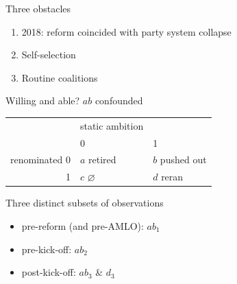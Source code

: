\documentclass[bigger]{beamer}
\begin{document}
\begin{frame}[label={sec:org280277d}]{Three obstacles}
\begin{enumerate}
\item 2018: reform coincided with party system collapse
\item Self-selection
\item Routine coalitions \pause
\end{enumerate}
\begin{block}{Willing and able? \(ab\) confounded}
\begin{center}
\begin{tabular}{rll}
 & static ambition & \\
 & 0 & 1\\
\hline
renominated 0 & \(a\) retired & \(b\) pushed out\\
1 & \(c\) \(\varnothing\) & \(d\) reran\\
\end{tabular}
\end{center}
\pause
\end{block}
\begin{block}{Three distinct subsets of observations}
\begin{itemize}
\item pre-reform (and pre-AMLO): \(ab_1\)
\item pre-kick-off: \(ab_2\)
\item post-kick-off: \(ab_3\) \& \(d_3\)
\end{itemize}
\end{block}
\end{frame}
\end{document}
